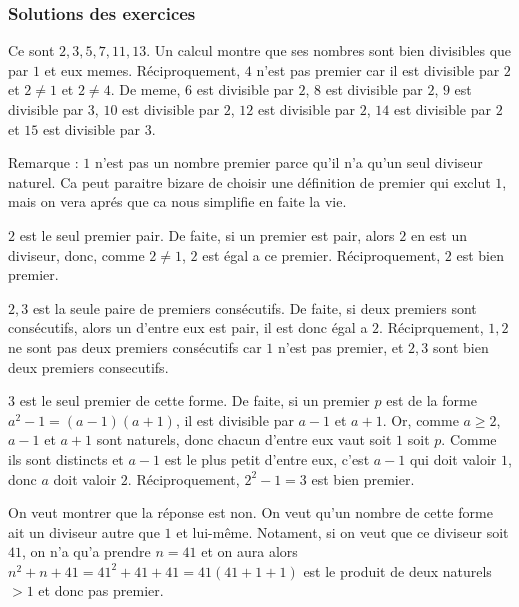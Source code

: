 \subsubsection{Solutions des exercices}
\sol

Ce sont \(2, 3, 5, 7, 11, 13\). Un calcul montre que ses nombres sont bien divisibles que par \(1\) et eux memes. Réciproquement, \(4\) n'est pas premier car il est divisible par \(2\) et \(2\not=1\) et \(2\not=4\). De meme, \(6\) est divisible par \(2\), \(8\) est divisible par \(2\), \(9\) est divisible par \(3\), \(10\) est divisible par \(2\), \(12\) est divisible par \(2\), \(14\) est divisible par \(2\) et \(15\) est divisible par \(3\).

Remarque : \(1\) n'est pas un nombre premier parce qu'il n'a qu'un seul diviseur naturel. Ca peut paraitre bizare de choisir une définition de premier qui exclut \(1\), mais on vera aprés que ca nous simplifie en faite la vie.

\sol

\(2\) est le seul premier pair. De faite, si un premier est pair, alors \(2\) en est un diviseur, donc, comme \(2\not=1\), \(2\) est égal a ce premier. Réciproquement, \(2\) est bien premier.

\sol

\(2, 3\) est la seule paire de premiers consécutifs. De faite, si deux premiers sont consécutifs, alors un d'entre eux est pair, il est donc égal a \(2\). Réciprquement, \(1, 2\) ne sont pas deux premiers consécutifs car \(1\) n'est pas premier, et \(2, 3\) sont bien deux premiers consecutifs.

\sol

\(3\) est le seul premier de cette forme. De faite, si un premier \(p\) est de la forme \(a^2 - 1 = \left(a-1\right)\left(a+1\right)\), il est divisible par \(a-1\) et \(a+1\). Or, comme \(a\geqslant2\), \(a-1\) et \(a+1\) sont naturels, donc chacun d'entre eux vaut soit \(1\) soit \(p\). Comme ils sont distincts et \(a-1\) est le plus petit d'entre eux, c'est \(a-1\) qui doit valoir \(1\), donc \(a\) doit valoir \(2\). Réciproquement, \(2^2 - 1 = 3\) est bien premier.

\sol

On veut montrer que la réponse est non. On veut qu'un nombre de cette forme ait un diviseur autre que \(1\) et lui-même. Notament, si on veut que ce diviseur soit \(41\), on n'a qu'a prendre \(n=41\) et on aura alors \(n^2 + n + 41 = 41^2 + 41 + 41 = 41 \left(41 + 1 + 1\right)\) est le produit de deux naturels \(>1\) et donc pas premier.

